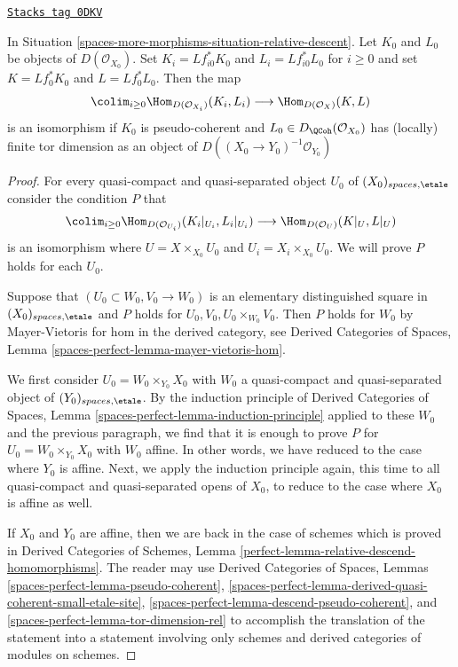 \begin{lemma}
\label{spaces-more-morphisms-lemma-relative-descend-homomorphisms}
\href{https://stacks.math.columbia.edu/tag/0DKV}{\texttt{Stacks tag 0DKV}}

In Situation \ref{spaces-more-morphisms-situation-relative-descent}.
Let $K_0$ and $L_0$ be objects of $D(\mathcal{O}_{X_0})$.
Set $K_i = Lf_{i0}^*K_0$ and $L_i = Lf_{i0}^*L_0$ for $i \geq 0$
and set $K = Lf_0^*K_0$ and $L = Lf_0^*L_0$. Then the map
$$
\colim_{i \geq 0} \Hom_{D(\mathcal{O}_{X_i})}(K_i, L_i)
\longrightarrow
\Hom_{D(\mathcal{O}_X)}(K, L)
$$
is an isomorphism if $K_0$ is pseudo-coherent and
$L_0 \in D_\QCoh(\mathcal{O}_{X_0})$ has (locally)
finite tor dimension as an object of
$D((X_0 \to Y_0)^{-1}\mathcal{O}_{Y_0})$
\end{lemma}

\begin{proof}
For every quasi-compact and quasi-separated object $U_0$ of
$(X_0)_{spaces, \etale}$ consider the condition $P$ that
$$
\colim_{i \geq 0} \Hom_{D(\mathcal{O}_{U_i})}(K_i|_{U_i}, L_i|_{U_i})
\longrightarrow
\Hom_{D(\mathcal{O}_U)}(K|_U, L|_U)
$$
is an isomorphism where $U = X \times_{X_0} U_0$ and
$U_i = X_i \times_{X_0} U_0$. We will prove $P$ holds for each $U_0$.

\medskip\noindent
Suppose that $(U_0 \subset W_0, V_0 \to W_0)$ is an elementary
distinguished square in $(X_0)_{spaces, \etale}$
and $P$ holds for $U_0, V_0, U_0 \times_{W_0} V_0$.
Then $P$ holds for $W_0$ by Mayer-Vietoris
for hom in the derived category, see Derived Categories of Spaces,
Lemma \ref{spaces-perfect-lemma-mayer-vietoris-hom}.

\medskip\noindent
We first consider $U_0 = W_0 \times_{Y_0} X_0$ with $W_0$ a
quasi-compact and quasi-separated object of $(Y_0)_{spaces, \etale}$.
By the induction principle of Derived Categories of Spaces,
Lemma \ref{spaces-perfect-lemma-induction-principle}
applied to these $W_0$ and the previous paragraph,
we find that it is enough to prove
$P$ for $U_0 = W_0 \times_{Y_0} X_0$ with $W_0$ affine.
In other words, we have reduced to the case where $Y_0$ is affine.
Next, we apply the induction principle again, this time to all
quasi-compact and quasi-separated opens of $X_0$, to reduce to the
case where $X_0$ is affine as well.

\medskip\noindent
If $X_0$ and $Y_0$ are affine, then we are back in the case
of schemes which is proved in
Derived Categories of Schemes, Lemma
\ref{perfect-lemma-relative-descend-homomorphisms}.
The reader may use
Derived Categories of Spaces, Lemmas
\ref{spaces-perfect-lemma-pseudo-coherent},
\ref{spaces-perfect-lemma-derived-quasi-coherent-small-etale-site},
\ref{spaces-perfect-lemma-descend-pseudo-coherent}, and
\ref{spaces-perfect-lemma-tor-dimension-rel}
to accomplish the translation of the statement into a statement
involving only schemes and derived categories of modules on schemes.
\end{proof}

